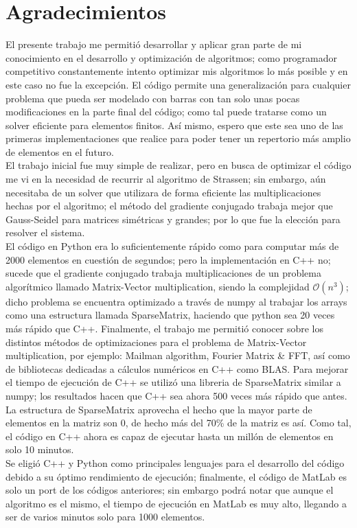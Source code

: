 \documentclass[12pt,a3paper]{article}
\begin{document}
\section{Agradecimientos}
El presente trabajo me permitió desarrollar y aplicar gran parte de mi conocimiento en el desarrollo y optimización de algoritmos; como programador competitivo constantemente intento optimizar mis algoritmos lo más posible y en este caso no fue la excepción. El código permite una generalización para cualquier problema que pueda ser modelado con barras con tan solo unas pocas modificaciones en la parte final del código; como tal puede tratarse como un solver eficiente para elementos finitos. Así mismo, espero que este sea uno de las primeras implementaciones que realice para poder tener un repertorio más amplio de elementos en el futuro.\\
El trabajo inicial fue muy simple de realizar, pero en busca de optimizar el código me vi en la necesidad de recurrir al algoritmo de Strassen; sin embargo, aún necesitaba de un solver que utilizara de forma eficiente las multiplicaciones hechas por el algoritmo; el método del gradiente conjugado trabaja mejor que Gauss-Seidel para matrices simétricas y grandes; por lo que fue la elección para resolver el sistema.\\
El código en Python era lo suficientemente rápido como para computar más de 2000 elementos en cuestión de segundos; pero la implementación en C++ no; sucede que el gradiente conjugado trabaja multiplicaciones de un problema algorítmico llamado Matrix-Vector multiplication, siendo la complejidad $\mathcal{O}(n^3)$; dicho problema se encuentra optimizado a través de numpy al trabajar los arrays como una estructura llamada SparseMatrix, haciendo que python sea 20 veces más rápido que C++. Finalmente, el trabajo me permitió conocer sobre los distintos métodos de optimizaciones para el problema de Matrix-Vector multiplication, por ejemplo: Mailman algorithm, Fourier Matrix \& FFT, así como de bibliotecas dedicadas a cálculos numéricos en C++ como BLAS. Para mejorar el tiempo de ejecución de C++ se utilizó una libreria de SparseMatrix similar a numpy; los resultados hacen que C++ sea ahora 500 veces más rápido que antes. La estructura de SparseMatrix aprovecha el hecho que la mayor parte de elementos en la matriz son 0, de hecho más del 70\% de la matriz es así. Como tal, el código en C++ ahora es capaz de ejecutar hasta un millón de elementos en solo 10 minutos.\\
Se eligió C++ y Python como principales lenguajes para el desarrollo del código debido a su óptimo rendimiento de ejecución; finalmente, el código de MatLab es solo un port de los códigos anteriores; sin embargo podrá notar que aunque el algoritmo es el mismo, el tiempo de ejecución en MatLab es muy alto, llegando a ser de varios minutos solo para 1000 elementos.\\
\end{document}

